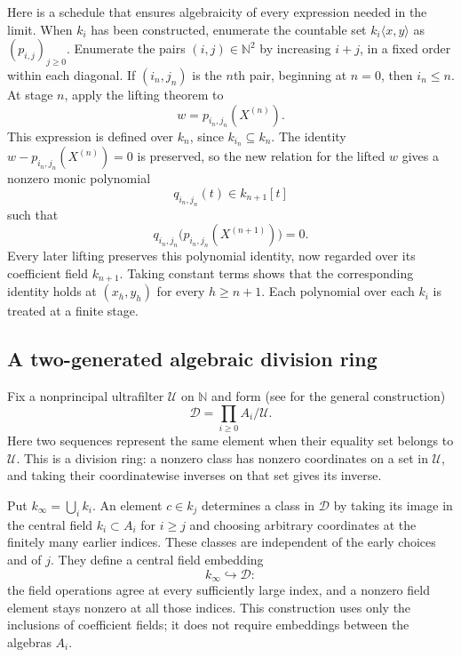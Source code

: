 Here is a schedule that ensures algebraicity of every expression
needed in the limit.  When $k_i$ has been constructed, enumerate the
countable set $k_i\langle x,y\rangle$ as
$(p_{i,j})_{j\geq0}$.  Enumerate the pairs $(i,j)\in\mathbb N^2$ by
increasing $i+j$, in a fixed order within each diagonal.  If $(i_n,j_n)$
is the $n$th pair, beginning at $n=0$, then $i_n\leq n$.
At stage $n$, apply the lifting theorem to
\[
 w=p_{i_n,j_n}(X^{(n)}).
\]
This expression is defined over $k_n$, since $k_{i_n}\subseteq k_n$.
The identity $w-p_{i_n,j_n}(X^{(n)})=0$ is preserved, so the new relation
for the lifted $w$ gives a nonzero monic polynomial
\[
 q_{i_n,j_n}(t)\in k_{n+1}[t]
\]
such that
\begin{equation}
 q_{i_n,j_n}\bigl(p_{i_n,j_n}(X^{(n+1)})\bigr)=0.
 \label{eq:retained-formal-relation}
\end{equation}
Every later lifting preserves this polynomial identity, now regarded
over its coefficient field $k_{n+1}$.  Taking constant terms shows that
the corresponding identity holds at $(x_h,y_h)$ for every $h\geq n+1$.
Each polynomial over each $k_i$ is treated at a finite stage.

\subsection{A two-generated algebraic division ring}

Fix a nonprincipal ultrafilter $\mathcal U$ on $\mathbb N$ and form
(see \cite{Keisler2010} for the general construction)
\[
 \mathcal D=\prod_{i\geq0} A_i\big/\mathcal U.
\]
Here two sequences represent the same element when their equality set
belongs to $\mathcal U$.  This is a division ring: a nonzero class has
nonzero coordinates on a set in $\mathcal U$, and taking their
coordinatewise inverses on that set gives its inverse.

Put $k_\infty=\bigcup_i k_i$.  An element $c\in k_j$ determines a class
in $\mathcal D$ by taking its image in the central field $k_i\subset A_i$
for $i\geq j$ and choosing arbitrary coordinates at the finitely many
earlier indices.  These classes are independent of the early choices
and of $j$.  They define a central field embedding
\[
 k_\infty\hookrightarrow\mathcal D:
\]
the field operations agree at every sufficiently large index, and a
nonzero field element stays nonzero at all those indices.  This
construction uses only the inclusions of coefficient fields; it does
not require embeddings between the algebras $A_i$.

